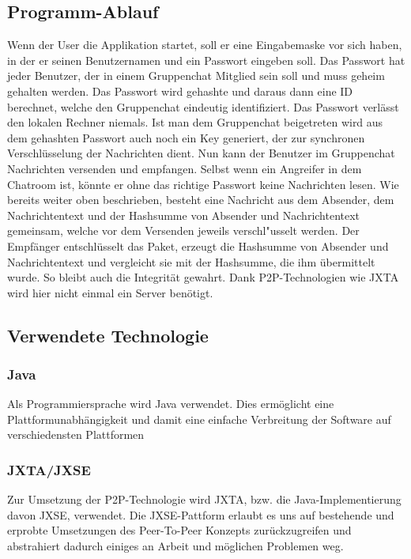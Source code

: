 \documentclass[12pt,a4paper,titlepage,oneside]{scrartcl}
\begin{document}
\newpage
\subsection{Programm-Ablauf}
Wenn der User die Applikation startet, soll er eine Eingabemaske vor sich haben, in der er seinen Benutzernamen und ein Passwort eingeben soll. Das Passwort hat jeder Benutzer, der in einem Gruppenchat Mitglied sein soll und muss geheim gehalten werden. Das Passwort wird gehashte und daraus dann eine ID berechnet, welche den Gruppenchat eindeutig identifiziert. Das Passwort verl\"{a}sst den lokalen Rechner niemals. Ist man dem Gruppenchat beigetreten wird aus dem gehashten Passwort auch noch ein Key generiert, der zur synchronen Verschl\"{u}sselung der Nachrichten dient. Nun kann der Benutzer im Gruppenchat Nachrichten versenden und empfangen. Selbst wenn ein Angreifer in dem Chatroom ist, k\"{o}nnte er ohne das richtige Passwort keine Nachrichten lesen.
Wie bereits weiter oben beschrieben, besteht eine Nachricht aus dem Absender, dem Nachrichtentext und der Hashsumme von Absender und Nachrichtentext gemeinsam, welche vor dem Versenden jeweils verschl"usselt werden. Der Empf\"{a}nger entschl\"{u}sselt das Paket, erzeugt die Hashsumme von Absender und Nachrichtentext und vergleicht sie mit der Hashsumme, die ihm \"{u}bermittelt wurde. So bleibt auch die Integrit\"{a}t gewahrt.
Dank P2P-Technologien wie JXTA wird hier nicht einmal ein Server ben\"{o}tigt.

\subsection{Verwendete Technologie}

\subsubsection{Java}
Als Programmiersprache wird Java verwendet. Dies erm\"{o}glicht eine Plattformunabh\"{a}ngigkeit und damit eine einfache Verbreitung der Software auf verschiedensten Plattformen

\subsubsection{JXTA/JXSE}
Zur Umsetzung der P2P-Technologie wird JXTA, bzw. die Java-Implementierung davon JXSE, verwendet. Die JXSE-Pattform erlaubt es uns auf bestehende und erprobte Umsetzungen des Peer-To-Peer Konzepts zur\"{u}ckzugreifen und abstrahiert dadurch einiges an Arbeit und m\"{o}glichen Problemen weg.
\end{document}
